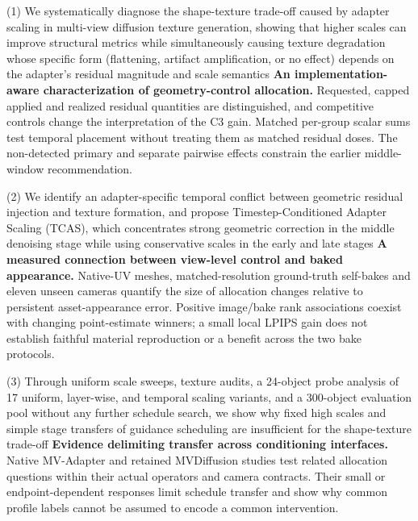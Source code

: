 \documentclass[times,twocolumn,final]{elsarticle}
\providecommand{\DIFadd}[1]{{\protect\color{blue} \sf #1}} %
\providecommand{\DIFdel}[1]{{\protect\color{red} \scriptsize #1}} %
\providecommand{\DIFaddbegin}{} %
\providecommand{\DIFaddend}{} %
\providecommand{\DIFdelbegin}{} %
\providecommand{\DIFdelend}{} %
\begin{document}
(1) \DIFdelbegin \DIFdel{We systematically diagnose the shape-texture trade-off caused by adapter scaling in multi-view diffusion texture generation, showing that higher scales can improve structural metrics while simultaneously causing texture degradation whose specific form (flattening, artifact amplification, or no effect) depends on the adapter's residual magnitude and scale semantics}\DIFdelend \DIFaddbegin \DIFadd{\textbf{An implementation-aware characterization of geometry-control allocation.} Requested, capped applied and realized residual quantities are distinguished, and competitive controls change the interpretation of the C3 gain. Matched per-group scalar sums test temporal placement without treating them as matched residual doses. The non-detected primary and separate pairwise effects constrain the earlier middle-window recommendation}\DIFaddend .

(2) \DIFdelbegin \DIFdel{We identify an adapter-specific temporal conflict between geometric residual injection and texture formation, and propose Timestep-Conditioned Adapter Scaling (TCAS), which concentrates strong geometric correction in the middle denoising stage while using conservative scales in the early and late stages}\DIFdelend \DIFaddbegin \DIFadd{\textbf{A measured connection between view-level control and baked appearance.} Native-UV meshes, matched-resolution ground-truth self-bakes and eleven unseen cameras quantify the size of allocation changes relative to persistent asset-appearance error. Positive image/bake rank associations coexist with changing point-estimate winners; a small local LPIPS gain does not establish faithful material reproduction or a benefit across the two bake protocols}\DIFaddend .

(3) \DIFdelbegin \DIFdel{Through uniform scale sweeps, texture audits, a 24-object probe analysis of 17 uniform, layer-wise, and temporal scaling variants, and a 300-object evaluation pool without any further schedule search, we show why fixed high scales and simple stage transfers of guidance scheduling are insufficient for the shape-texture trade-off}\DIFdelend \DIFaddbegin \DIFadd{\textbf{Evidence delimiting transfer across conditioning interfaces.} Native MV-Adapter and retained MVDiffusion studies test related allocation questions within their actual operators and camera contracts. Their small or endpoint-dependent responses limit schedule transfer and show why common profile labels cannot be assumed to encode a common intervention}\DIFaddend .
\end{document}
